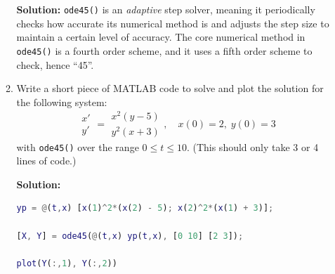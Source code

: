 \documentclass[letterpaper, fontsize=12pt]{scrartcl} %
\numberwithin{equation}{section} %
\numberwithin{figure}{section} %
\numberwithin{table}{section} %
\begin{document}
\begin{enumerate}
\begin{enumerate}[label = (\alph*)]
\par \textbf{Solution:} \texttt{ode45()} is an \textit{adaptive} step solver, meaning it periodically checks how accurate its numerical method is and adjusts the step size to maintain a certain level of accuracy. The core numerical method in \texttt{ode45()} is a fourth order scheme, and it uses a fifth order scheme to check, hence ``45''.

\item Write a short piece of MATLAB code to solve and plot the solution for the following system:
\[ \begin{matrix} x' \\ y' \end{matrix} = \begin{matrix} x^2(y - 5) \\ y^2(x +3) \end{matrix}, \quad x(0) = 2, \;y(0) = 3 \]
with \texttt{ode45()} over the range $0 \leq t \leq 10$. (This should only take 3 or 4 lines of code.) 

\par \textbf{Solution:} 

\begin{lstlisting}[language=Matlab]
yp = @(t,x) [x(1)^2*(x(2) - 5); x(2)^2*(x(1) + 3)];

[X, Y] = ode45(@(t,x) yp(t,x), [0 10] [2 3]);

plot(Y(:,1), Y(:,2))

\end{lstlisting}


\end{enumerate}


\end{enumerate}

\end{document}
